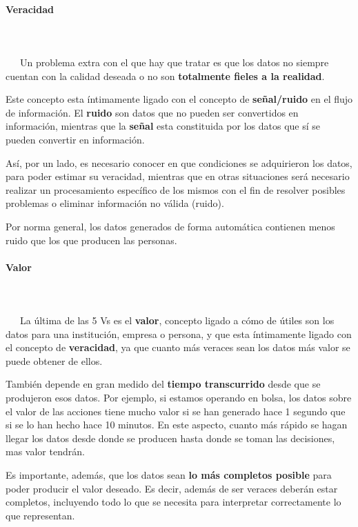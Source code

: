\paragraph{Veracidad}
~\\\\
\-\ \-\ \-\ Un problema extra con el que hay que tratar es que los datos no siempre cuentan con la calidad deseada o no son \textbf{totalmente fieles a la realidad}. 

Este concepto esta íntimamente ligado con el concepto de \textbf{señal/ruido} en el flujo de información. El \textbf{ruido} son datos que no pueden ser convertidos en información, mientras que la \textbf{señal} esta constituida por los datos que sí se pueden convertir en información. 

Así, por un lado, es necesario conocer en que condiciones se adquirieron los datos, para poder estimar su veracidad, mientras que en otras situaciones será necesario realizar un procesamiento específico de los mismos con el fin de resolver posibles problemas o eliminar información no válida (ruido).

Por norma general, los datos generados de forma automática contienen menos ruido que los que producen las personas.

\paragraph{Valor}
~\\\\
\-\ \-\ \-\ La última de las 5 Vs es el \textbf{valor}, concepto ligado a cómo de útiles son los datos para una institución, empresa o persona, y que esta íntimamente ligado con el concepto de \textbf{veracidad}, ya que cuanto más veraces sean los datos más valor se puede obtener de ellos. 

También depende en gran medido del \textbf{tiempo transcurrido} desde que se produjeron esos datos. Por ejemplo, si estamos operando en bolsa, los datos sobre el valor de las acciones tiene mucho valor si se han generado hace 1 segundo que si se lo han hecho hace 10 minutos. En este aspecto, cuanto más rápido se hagan llegar los datos desde donde se producen hasta donde se toman las decisiones, mas valor tendrán.

Es importante, además, que los datos sean \textbf{lo más completos posible} para poder producir el valor deseado. Es decir, además de ser veraces deberán estar completos, incluyendo todo lo que se necesita para interpretar correctamente lo que representan.

